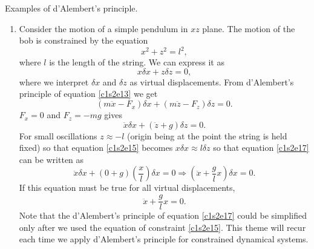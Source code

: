 Examples of d'Alembert's principle.
\begin{enumerate}
\item Consider the motion of a simple pendulum in $xz$ plane. The motion
of the bob is constrained by the equation
\begin{equation}\label{c1s2e14}
x^2 + z^2 = l^2,
\end{equation}
where $l$ is the length of the string. We can express it as
\begin{equation}\label{c1s2e15}
x\delta x + z\delta z = 0,
\end{equation}
where we interpret $\delta x$ and $\delta z$ as virtual displacements.
From d'Alembert's principle of equation \eqref{c1s2e13} we get
\begin{equation}\label{c1s2e16}
(m\ddot{x} - F_x)\delta x + (m\ddot{z} - F_z)\delta z = 0.
\end{equation}
$F_x = 0$ and $F_z = -mg$ gives
\begin{equation}\label{c1s2e17}
\ddot{x} \delta x + (\ddot{z} + g)\delta z = 0.
\end{equation}
For small oscillations $z \approx -l$ (origin being at the point the string 
is held fixed) so that equation \eqref{c1s2e15} becomes
$x \delta x \approx l \delta z$ so that equation \eqref{c1s2e17} can
be written as
\begin{equation}\label{c1s2e18}
\ddot{x} \delta x + (0 + g)\left(\frac{x}{l}\right)\delta x = 0
\Rightarrow \left(\ddot{x} + \frac{g}{l}x\right)\delta x = 0.
\end{equation}
If this equation must be true for all virtual displacements,
\begin{equation}\label{c1s2e19}
\ddot{x} + \frac{g}{l}x = 0.
\end{equation}
Note that the d'Alembert's principle of equation \eqref{c1s2e17} could be
simplified only after we used the equation of constraint \eqref{c1s2e15}. This
theme will recur each time we apply d'Alembert's principle for constrained 
dynamical systems.


\end{enumerate}
